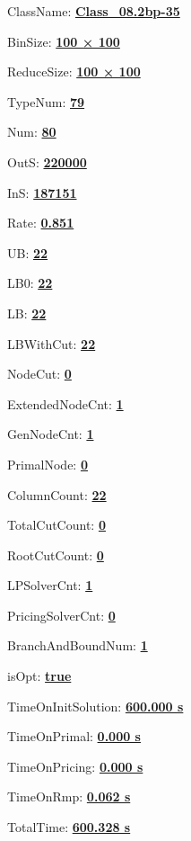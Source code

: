 \documentclass[11pt]{article}
\begin{document}
\pagestyle{empty}


ClassName: \underline{\textbf{Class_08.2bp-35}}
\par
BinSize: \underline{\textbf{100 × 100}}
\par
ReduceSize: \underline{\textbf{100 × 100}}
\par
TypeNum: \underline{\textbf{79}}
\par
Num: \underline{\textbf{80}}
\par
OutS: \underline{\textbf{220000}}
\par
InS: \underline{\textbf{187151}}
\par
Rate: \underline{\textbf{0.851}}
\par
UB: \underline{\textbf{22}}
\par
LB0: \underline{\textbf{22}}
\par
LB: \underline{\textbf{22}}
\par
LBWithCut: \underline{\textbf{22}}
\par
NodeCut: \underline{\textbf{0}}
\par
ExtendedNodeCnt: \underline{\textbf{1}}
\par
GenNodeCnt: \underline{\textbf{1}}
\par
PrimalNode: \underline{\textbf{0}}
\par
ColumnCount: \underline{\textbf{22}}
\par
TotalCutCount: \underline{\textbf{0}}
\par
RootCutCount: \underline{\textbf{0}}
\par
LPSolverCnt: \underline{\textbf{1}}
\par
PricingSolverCnt: \underline{\textbf{0}}
\par
BranchAndBoundNum: \underline{\textbf{1}}
\par
isOpt: \underline{\textbf{true}}
\par
TimeOnInitSolution: \underline{\textbf{600.000 s}}
\par
TimeOnPrimal: \underline{\textbf{0.000 s}}
\par
TimeOnPricing: \underline{\textbf{0.000 s}}
\par
TimeOnRmp: \underline{\textbf{0.062 s}}
\par
TotalTime: \underline{\textbf{600.328 s}}
\par
\newpage


\end{document}
